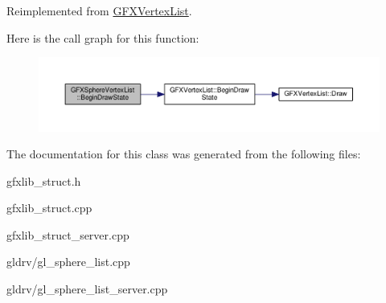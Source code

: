 Reimplemented from \hyperlink{classGFXVertexList_adf3bac4d8b6c7c2941d046007a0bdaf5}{G\+F\+X\+Vertex\+List}.



Here is the call graph for this function\+:
\nopagebreak
\begin{figure}[H]
\begin{center}
\leavevmode
\includegraphics[width=350pt]{d9/d56/classGFXSphereVertexList_af80a8ac097f61c86aed76ee7b12968e4_cgraph}
\end{center}
\end{figure}




The documentation for this class was generated from the following files\+:\begin{DoxyCompactItemize}
\item 
gfxlib\+\_\+struct.\+h\item 
gfxlib\+\_\+struct.\+cpp\item 
gfxlib\+\_\+struct\+\_\+server.\+cpp\item 
gldrv/gl\+\_\+sphere\+\_\+list.\+cpp\item 
gldrv/gl\+\_\+sphere\+\_\+list\+\_\+server.\+cpp\end{DoxyCompactItemize}
